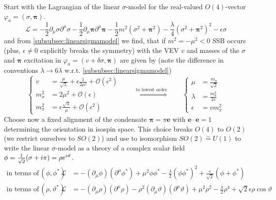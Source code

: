 Start with the Lagrangian of the linear $\sigma$-model for the real-valued $O(4)$-vector $\varphi_a=(\sigma,\mathbf{\pi})$.
\begin{equation}
    \mathscr{L}=-\frac{1}{2}\partial_\mu\sigma\partial^\mu\sigma-\frac{1}{2}\partial_\mu\mathbf{\pi}\partial^\mu\mathbf{\pi}-\frac{1}{2}m^2(\sigma^2+\mathbf{\pi}^2)-\frac{\lambda}{4}(\sigma^2+\mathbf{\pi}^2)^2-\epsilon\sigma
\end{equation}
and from \ref{subsubsec:linearsigmamodel} we find, that if $m^2=-\mu^2<0$ SSB occurs (plus, $\epsilon\neq 0$ explicitly breaks the symmetry) with the VEV $v$ and masses of the $\sigma$ and $\mathbf{\pi}$ excitation in $\varphi_a=(v+\delta\sigma,\mathbf{\pi})$ are given by (note the difference in conventions $\lambda\to 6\lambda$ w.r.t. \ref{subsubsec:linearsigmamodel})
\begin{equation}
    \left\{
    \begin{split}
        v          & =\frac{\mu}{\sqrt{\lambda}}+\epsilon\frac{1}{2\mu^2}+\mathcal{O}(\epsilon^2) \\
        m_\sigma^2 & =2\mu^2+\mathcal{O}(\epsilon)                                                \\
        m_\pi^2    & =\epsilon\frac{\sqrt{\lambda}}{\mu}+\mathcal{O}(\epsilon^2)
    \end{split}
    \right.\qquad\overset{\text{to lowest order}}{\iff}\qquad
    \left\{
    \begin{split}
        \mu&=\frac{m_\sigma}{\sqrt{2}}\\
        \lambda&=\frac{m_\sigma^2}{2v}\\
        \epsilon&=vm_\pi^2
    \end{split}
    \right.
\end{equation}
Choose now a fixed alignment of the condensate $\mathbf{\pi}=\pi\mathbf{e}$ with $\mathbf{e}\cdot\mathbf{e}=1$ determining the orientation in isospin space. This choice breaks $O(4)$ to $O(2)$ (we restrict ourselves to $SO(2)$) and use to isomorphism $SO(2)\overset{\sim}{=}U(1)$ to write the linear $\sigma$-model as a theory of a complex scalar field $\phi=\frac{1}{\sqrt{2}}(\sigma+{i}\pi)=\rho e^{{i}\vartheta}$.
\begin{subequations}
    \begin{align}
        \text{in terms of}\,(\phi,\phi^*)      &  & \mathscr{L} & =-(\partial_\mu\phi)(\partial^\mu\phi^*)+\mu^2\phi\phi^*-\frac{\lambda}{2}(\phi\phi^*)^2+\frac{\epsilon}{\sqrt{2}}(\phi+\phi^*)                                   \\
        \text{in terms of}\,(\rho,\vartheta^*) &  & \mathscr{L} & =-(\partial_\mu\rho)(\partial^\mu\rho)-\rho^2(\partial_\mu\vartheta)(\partial^\mu\vartheta)+\mu^2\rho^2-\frac{\lambda}{2}\rho^4+\sqrt{2}\epsilon\rho\cos\vartheta
    \end{align}
\end{subequations}
